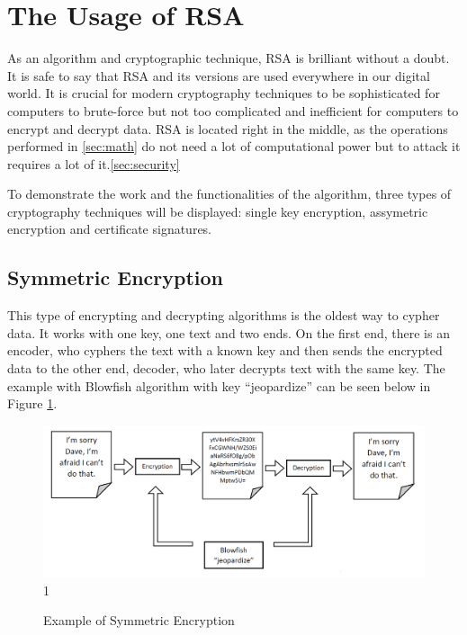 \documentclass[a4paper, 12pt]{article}
\begin{document}
\section{The Usage of RSA}
\label{sec:usage}

As an algorithm and cryptographic technique, RSA is brilliant without a doubt. It is safe to say
that RSA and its versions are used everywhere in our digital world. It is crucial for modern
cryptography techniques to be sophisticated for computers to brute-force but not too complicated
and inefficient for computers to encrypt and decrypt data. RSA is located right in the middle, as
the operations performed in \ref{sec:math} do not need a lot of computational power but to attack it requires a lot of it.\ref{sec:security}

To demonstrate the work and the functionalities of the algorithm, three types of cryptography techniques will be displayed:
single key encryption, assymetric encryption and certificate signatures.

\subsection{Symmetric Encryption}
\label{bsec:symmetry}

This type of encrypting and decrypting algorithms is the oldest way to cypher data. It works with
one key, one text and two ends. On the first end, there is an encoder, who cyphers the text with a
known key and then sends the encrypted data to the other end, decoder, who later decrypts text
with the same key. The example with Blowfish\cite{blowfish} algorithm with key
“jeopardize” can be seen below in Figure \ref{fig:symmetric}.

\begin{figure}[ht]
  \begin{center}
    \includegraphics[width=\textwidth]{symmetric.png}1
    \caption{Example of Symmetric Encryption}
    \label{fig:symmetric}
    \end{center}
  \end{figure}
\end{document}
